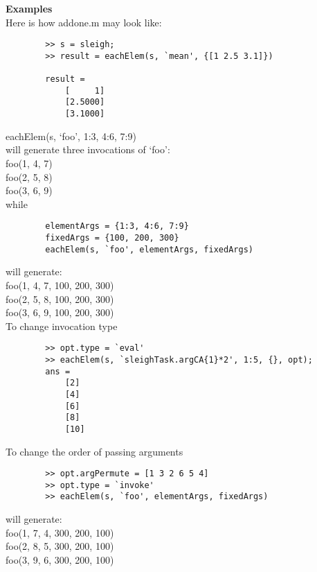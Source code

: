 \begin{list}{}{}
\begin{itemize}
	\end{itemize}
    
	\item {\bf Examples}\\
	Here is how addone.m may look like:
		\begin{verbatim}
		>> s = sleigh;
		>> result = eachElem(s, `mean', {[1 2.5 3.1]})

		result =
		    [     1]
  		    [2.5000]
		    [3.1000]
		\end{verbatim}	

		eachElem(s, `foo', {1:3, 4:6, 7:9})\\

		will generate three invocations of `foo':\\

			foo(1, 4, 7)\\
			foo(2, 5, 8)\\
			foo(3, 6, 9)\\

		while

		\begin{verbatim}
		elementArgs = {1:3, 4:6, 7:9}
		fixedArgs = {100, 200, 300}
		eachElem(s, `foo', elementArgs, fixedArgs)
		\end{verbatim}

		will generate:\\

		foo(1, 4, 7, 100, 200, 300)\\
		foo(2, 5, 8, 100, 200, 300)\\
		foo(3, 6, 9, 100, 200, 300)\\
        
        To change invocation type
	
		\begin{verbatim}
		>> opt.type = `eval'
		>> eachElem(s, `sleighTask.argCA{1}*2', 1:5, {}, opt);
		ans = 
		    [2]
		    [4]
		    [6]
		    [8]
		    [10]
		\end{verbatim}
		
		To change the order of passing arguments
	
		\begin{verbatim}
		>> opt.argPermute = [1 3 2 6 5 4]
		>> opt.type = `invoke'
		>> eachElem(s, `foo', elementArgs, fixedArgs)
		\end{verbatim}
	    
		will generate:\\
	 
			foo(1, 7, 4, 300, 200, 100)\\
			foo(2, 8, 5, 300, 200, 100)\\
			foo(3, 9, 6, 300, 200, 100)\\
\end{list}

